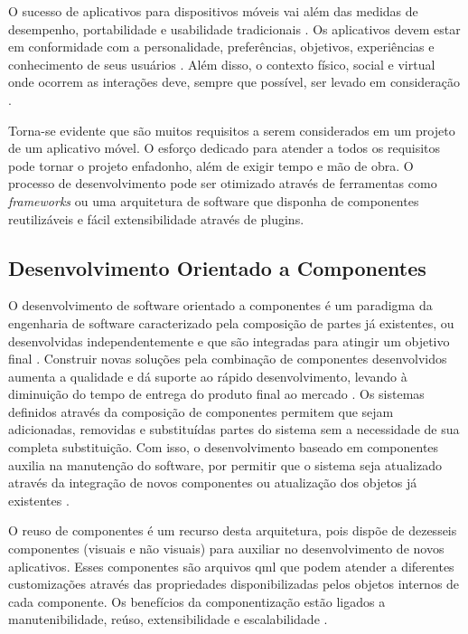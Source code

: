 O sucesso de aplicativos para dispositivos móveis vai além das medidas de desempenho, portabilidade e usabilidade tradicionais \cite{Kronbauer:2012:UEE:2393536.2393582}. Os aplicativos devem estar em conformidade com a personalidade, preferências, objetivos, experiências e conhecimento de seus usuários \cite{Vermeeren:2010:UEE:1868914.1868973}. Além disso, o contexto físico, social e virtual onde ocorrem as interações deve, sempre que possível, ser levado em consideração \cite{McCarthy:2004:TE:1015530.1015549}.\par

Torna-se evidente que são muitos requisitos a serem considerados em um projeto de um aplicativo móvel. O esforço dedicado para atender a todos os requisitos pode tornar o projeto enfadonho, além de exigir tempo e mão de obra. O processo de desenvolvimento pode ser otimizado através de ferramentas como \textit{frameworks} ou uma arquitetura de software que disponha de componentes reutilizáveis e fácil extensibilidade através de plugins.


\subsection{Desenvolvimento Orientado a Componentes}
O desenvolvimento de software orientado a componentes é um paradigma da engenharia de software caracterizado pela composição de partes já existentes, ou desenvolvidas independentemente e que são integradas para atingir um objetivo final \cite{rafael_heider}. Construir novas soluções pela combinação de componentes desenvolvidos aumenta a qualidade e dá suporte ao rápido desenvolvimento, levando à diminuição do tempo de entrega do produto final ao mercado \cite{rafael_heider}. Os sistemas definidos através da composição de componentes permitem que sejam adicionadas, removidas e substituídas partes do sistema sem a necessidade de sua completa substituição. Com isso, o desenvolvimento baseado em componentes auxilia na manutenção do software, por permitir que o sistema seja atualizado através da integração de novos componentes ou atualização dos objetos já existentes \cite{szyperski_bosch_weck_1999}.\par

O reuso de componentes é um recurso desta arquitetura, pois dispõe de dezesseis componentes (visuais e não visuais) para auxiliar no desenvolvimento de novos aplicativos. Esses componentes são arquivos qml que podem atender a diferentes customizações através das propriedades disponibilizadas pelos objetos internos de cada componente. Os benefícios da componentização estão ligados a manutenibilidade, reúso, extensibilidade e escalabilidade \cite{D'Souza:1998:OCF:291139}.


